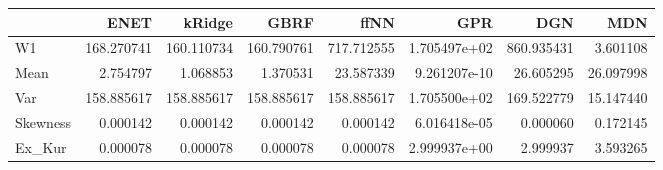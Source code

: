 \begin{tabular}{lrrrrrrr}
\toprule
{} &        ENET &      kRidge &        GBRF &        ffNN &           GPR &         DGN &        MDN \\
\midrule
W1       &  168.270741 &  160.110734 &  160.790761 &  717.712555 &  1.705497e+02 &  860.935431 &   3.601108 \\
Mean     &    2.754797 &    1.068853 &    1.370531 &   23.587339 &  9.261207e-10 &   26.605295 &  26.097998 \\
Var      &  158.885617 &  158.885617 &  158.885617 &  158.885617 &  1.705500e+02 &  169.522779 &  15.147440 \\
Skewness &    0.000142 &    0.000142 &    0.000142 &    0.000142 &  6.016418e-05 &    0.000060 &   0.172145 \\
Ex\_Kur   &    0.000078 &    0.000078 &    0.000078 &    0.000078 &  2.999937e+00 &    2.999937 &   3.593265 \\
\bottomrule
\end{tabular}
